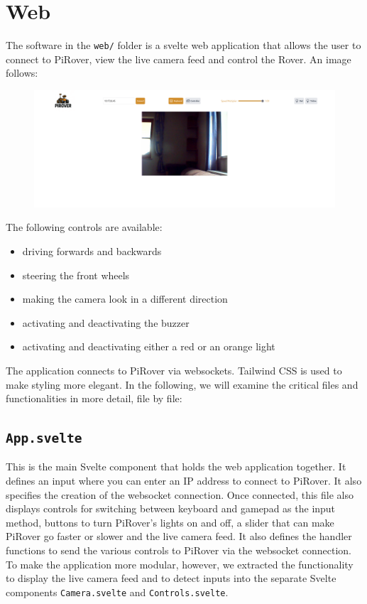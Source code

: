 \section{Web}

The software in the \texttt{web/} folder is a svelte web application that allows the user to connect to PiRover, view the live camera feed and control the Rover. An image follows:

\begin{figure}[H]
    \centering
    \includegraphics[width=\textwidth]{img/web.png}
\end{figure}

The following controls are available:

\begin{itemize}
    \item driving forwards and backwards
    \item steering the front wheels
    \item making the camera look in a different direction
    \item activating and deactivating the buzzer
    \item activating and deactivating either a red or an orange light
\end{itemize}

The application connects to PiRover via websockets. Tailwind CSS is used to make styling more elegant. In the following, we will examine the critical files and functionalities in more detail, file by file:

\subsection*{\texttt{App.svelte}}

This is the main Svelte component that holds the web application together. It defines an input where you can enter an IP address to connect to PiRover. It also specifies the creation of the websocket connection. Once connected, this file also displays controls for switching between keyboard and gamepad as the input method, buttons to turn PiRover's lights on and off, a slider that can make PiRover go faster or slower and the live camera feed. It also defines the handler functions to send the various controls to PiRover via the websocket connection. To make the application more modular, however, we extracted the functionality to display the live camera feed and to detect inputs into the separate Svelte components \texttt{Camera.svelte} and \texttt{Controls.svelte}.

